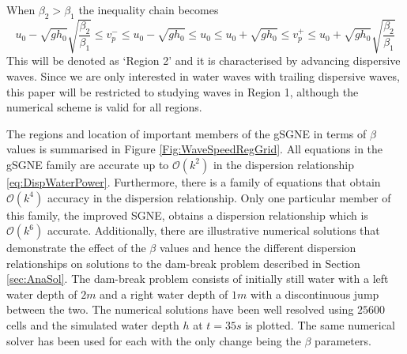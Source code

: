 \documentclass[10pt]{elsarticle}
\begin{document}
When ${\beta_2} >  \beta_1 $ the inequality chain becomes
\begin{equation}
u_0 - \sqrt{gh_0} \sqrt{\dfrac{\beta_2}{ \beta_1}} \le v^-_p \le u_0 -  \sqrt{gh_0} \le  u_0 \le u_0 + \sqrt{gh_0} \le   v^+_p  \le u_0 +  \sqrt{gh_0} \sqrt{\dfrac{\beta_2}{ \beta_1}}
\label{eq:wavespeedbound2}
\end{equation}
This will be denoted as `Region 2' and it is characterised by advancing dispersive waves. Since we are only interested in water waves with trailing dispersive waves, this paper will be restricted to studying waves in Region 1, although the numerical scheme is valid for all regions.   

The regions and location of important members of the gSGNE in terms of $\beta$ values is summarised in Figure \ref{Fig:WaveSpeedRegGrid}. All equations in the gSGNE family are accurate up to $\mathcal{O}(k^2)$ in the dispersion relationship \eqref{eq:DispWaterPower}. Furthermore, there is a family of equations that obtain $\mathcal{O}(k^4)$ accuracy in the dispersion relationship. Only one particular member of this family, the improved SGNE, obtains a dispersion relationship which is $\mathcal{O}(k^6)$ accurate. Additionally, there are illustrative numerical solutions that demonstrate the effect of the $\beta$ values and hence the different dispersion relationships on solutions to the dam-break problem described in Section \ref{sec:AnaSol}. The dam-break problem consists of initially still water with a left water depth of $2m$ and a right water depth of $1m$ with a discontinuous jump between the two. The numerical solutions have been well resolved using $25600$ cells and the simulated water depth $h$ at $t=35s$ is plotted. The same numerical solver has been used for each with the only change being the $\beta$ parameters.
\end{document}
